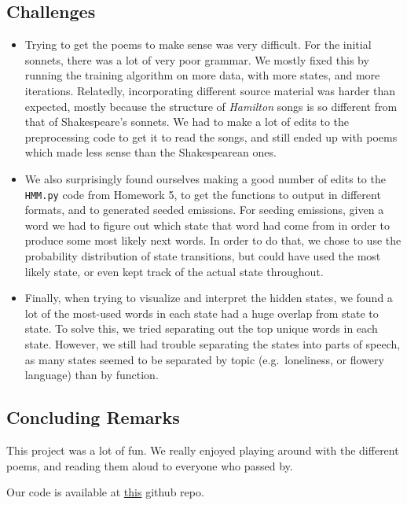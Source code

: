 \subsection{Challenges}
\begin{itemize}
	\item Trying to get the poems to make sense was very difficult.  For the initial sonnets, there was a lot of very poor grammar.  We mostly fixed this by running the training algorithm on more data, with more states, and more iterations.
Relatedly, incorporating different source material was harder than expected, mostly because the structure of \emph{Hamilton} songs is so different from that of Shakespeare's sonnets.  We had to make a lot of edits to the preprocessing code to get it to read the songs, and still ended up with poems which made less sense than the Shakespearean ones.
	\item We also surprisingly found ourselves making a good number of edits to the {\tt HMM.py} code from Homework 5, to get the functions to output in different formats, and to generated seeded emissions.  For seeding emissions, given a word we had to figure out which state that word had come from in order to produce some most likely next words.  In order to do that, we chose to use the probability distribution of state transitions, but could have used the most likely state, or even kept track of the actual state throughout.
	\item Finally, when trying to visualize and interpret the hidden states, we found a lot of the most-used words in each state had a huge overlap from state to state.  To solve this, we tried separating out the top unique words in each state.  However, we still had trouble separating the states into parts of speech, as many states seemed to be separated by topic (e.g.\ loneliness, or flowery language) than by function.
\end{itemize}



\subsection{Concluding Remarks}

This project was a lot of fun.  We really enjoyed playing around with the different poems, and reading them aloud to everyone who passed by.  

Our code is available at \href{https://github.com/carlyrobison/sonnetspoofer/}{this} github repo.







